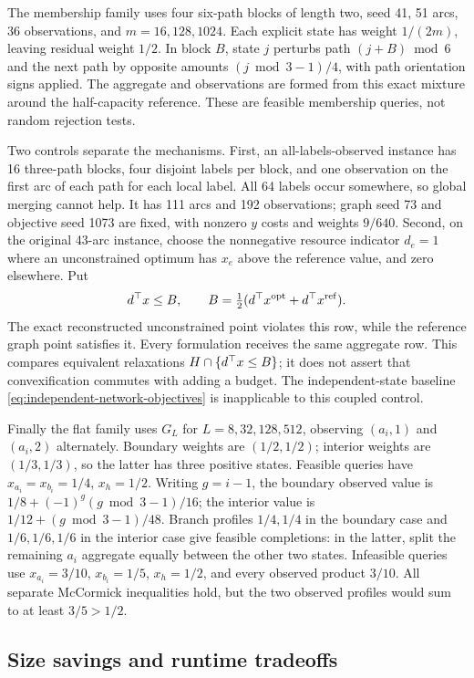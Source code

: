 The membership family uses four six-path blocks of length two, seed 41,
51 arcs, 36 observations, and $m=16,128,1024$. Each explicit state has
weight $1/(2m)$, leaving residual weight $1/2$. In block $B$, state
$j$ perturbs path $(j+B)\bmod6$ and the next path by opposite amounts
$(j\bmod3-1)/4$, with path orientation signs applied. The aggregate
and observations are formed from this exact mixture around the half-capacity
reference. These are feasible membership queries, not random rejection tests.

Two controls separate the mechanisms. First, an all-labels-observed instance
has 16 three-path blocks, four disjoint labels per block, and one observation
on the first arc of each path for each local label. All 64 labels occur
somewhere, so global merging cannot help. It has 111 arcs and 192 observations;
graph seed 73 and objective seed 1073 are fixed, with nonzero $y$ costs and
weights $9/640$. Second, on the original 43-arc instance, choose the
nonnegative resource indicator $d_e=1$ where an unconstrained optimum has
$x_e$ above the reference value, and zero elsewhere. Put
\[
 d^\top x\le B,\qquad
 B=\tfrac12(d^\top x^{\rm opt}+d^\top x^{\rm ref}).
\]
The exact reconstructed unconstrained point violates this row, while the
reference graph point satisfies it. Every formulation receives the same
aggregate row. This compares equivalent relaxations $H\cap\{d^\top x\le B\}$;
it does not assert that convexification commutes with adding a budget.
The independent-state baseline \eqref{eq:independent-network-objectives}
is inapplicable to this coupled control.

Finally the flat family uses $G_L$ for $L=8,32,128,512$, observing
$(a_i,1)$ and $(a_i,2)$ alternately. Boundary weights are $(1/2,1/2)$;
interior weights are $(1/3,1/3)$, so the latter has three positive
states. Feasible queries have $x_{a_i}=x_{b_i}=1/4$, $x_h=1/2$.
Writing $g=i-1$, the boundary observed value is
$1/8+(-1)^g(g\bmod3-1)/16$; the interior value is
$1/12+(g\bmod3-1)/48$. Branch profiles $1/4,1/4$ in the boundary
case and $1/6,1/6,1/6$ in the interior case give feasible completions:
in the latter, split the remaining $a_i$ aggregate equally between
the other two states. Infeasible queries use
$x_{a_i}=3/10$, $x_{b_i}=1/5$, $x_h=1/2$, and every observed
product $3/10$. All separate McCormick inequalities hold, but the
two observed profiles would sum to at least $3/5>1/2$.

\subsection{Size savings and runtime tradeoffs}

